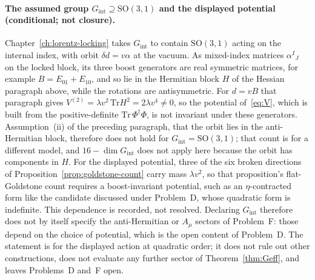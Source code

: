 \paragraph{The assumed group \(G_{\mathrm{int}}\supseteq\mathrm{SO}(3,1)\)
and the displayed potential (conditional; not closure).}
Chapter~\ref{ch:lorentz-locking} takes \(G_{\mathrm{int}}\) to contain
\(\mathrm{SO}(3,1)\) acting on the internal index, with orbit
\(\delta d=v\alpha\) at the vacuum.  As mixed-index matrices
\(\alpha^I{}_J\) on the locked block, its three boost generators are
real symmetric matrices, for example \(B=E_{01}+E_{10}\), and so lie in
the Hermitian block \(H\) of the Hessian paragraph above, while the
rotations are antisymmetric.  For \(d=vB\) that paragraph gives
\(V^{(2)}=\lambda v^2\,\mathrm{Tr}H^2=2\lambda v^4\neq0\), so the
potential of~\eqref{eq:V}, which is built from the positive-definite
\(\mathrm{Tr}\,\Phi^\dagger\Phi\), is not invariant under these
generators.  Assumption~(ii) of the preceding paragraph, that the orbit
lies in the anti-Hermitian block, therefore does not hold for
\(G_{\mathrm{int}}=\mathrm{SO}(3,1)\); that count is for a different
model, and \(16-\dim G_{\mathrm{int}}\) does not apply here because the
orbit has components in \(H\).  For the displayed potential, three of
the six broken directions of Proposition~\ref{prop:goldstone-count}
carry mass \(\lambda v^2\), so that proposition's flat-Goldstone count
requires a boost-invariant potential, such as an \(\eta\)-contracted
form like the candidate discussed under Problem~D, whose quadratic form
is indefinite.  This dependence is recorded, not resolved.  Declaring
\(G_{\mathrm{int}}\) therefore does not by itself specify the
anti-Hermitian or \(A_\mu\) sectors of Problem~F: those depend on the
choice of potential, which is the open content of Problem~D.  The
statement is for the displayed action at quadratic order; it does not
rule out other constructions, does not evaluate any further sector of
Theorem~\ref{thm:Geff}, and leaves Problems~D and~F open.

